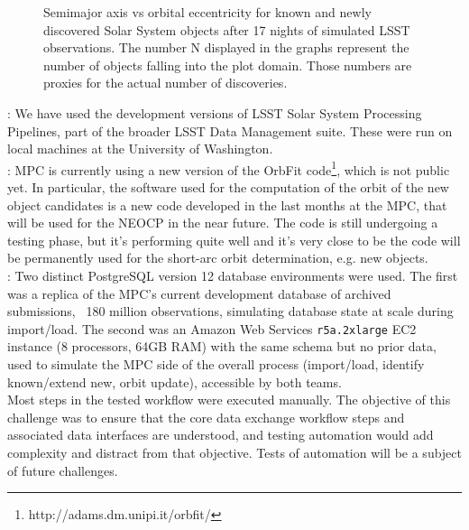 \begin{figure}
	\caption{Semimajor axis vs orbital eccentricity for known and newly discovered Solar System objects after 17 nights of simulated LSST observations. The number N displayed in the graphs represent the number of objects falling into the plot domain. Those numbers are proxies for the actual number of discoveries.}
	\label{fig:ssodataset}
\end{figure}

: We have used the development versions of LSST Solar System Processing Pipelines, part of the broader LSST Data Management suite. These were run on local machines at the University of Washington.
\\



: MPC is currently using a new version of the OrbFit code\footnote{http://adams.dm.unipi.it/orbfit/}, which is not public yet. In particular, the software used for the computation of the orbit of the new object candidates is a new code developed in the last months at the MPC, that will be used for the NEOCP in the near future. The code is still undergoing a testing phase, but it's performing quite well and it's very close to be the code will be permanently used for the short-arc orbit determination, e.g. new objects. 
\\

: Two distinct PostgreSQL version 12 database environments were used. The first was a replica of the MPC’s current development database of archived submissions, ~180 million observations, simulating database state at scale during import/load. The second was an Amazon Web Services {\tt r5a.2xlarge} EC2 instance (8 processors, 64GB RAM) with the same schema but no prior data, used to simulate the MPC side of the overall process (import/load, identify known/extend new, orbit update), accessible by both teams.
\\

 Most steps in the tested workflow were executed manually. The objective of this challenge was to ensure that the core data exchange workflow steps and associated data interfaces are understood, and testing automation would add complexity and distract from that objective. Tests of automation will be a subject of future challenges.

